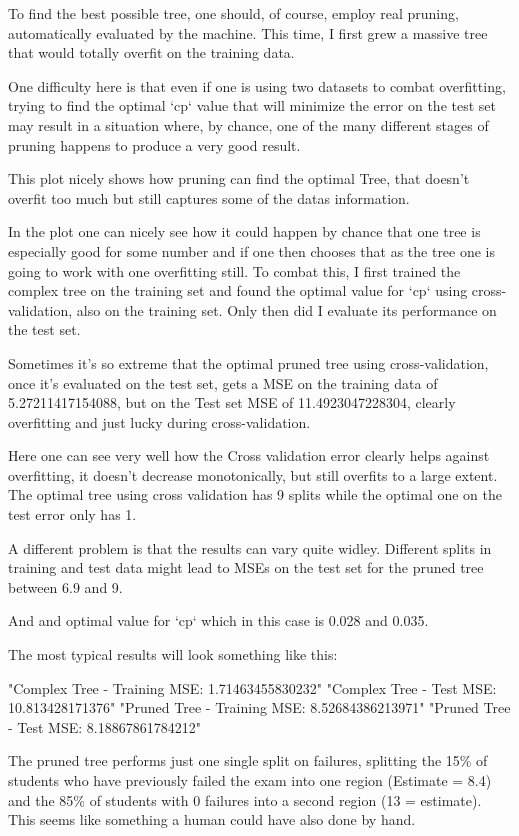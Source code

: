 \documentclass[12pt]{article}
\begin{document}
To find the best possible tree, one should, of course, employ real pruning, automatically evaluated by the machine. This time, I first grew a massive tree that would totally overfit on the training data.

One difficulty here is that even if one is using two datasets to combat overfitting, trying to find the optimal `cp` value that will minimize the error on the test set may result in a situation where, by chance, one of the many different stages of pruning happens to produce a very good result.



This plot nicely shows how pruning can find the optimal Tree, that doesn't overfit too much but still captures some of the datas information.

In the  plot one can nicely see how it could happen by chance that one tree is especially good for some number and if one then chooses that as the tree one is going to work with one overfitting still.
To combat this, I first trained the complex tree on the training set and found the optimal value for `cp` using cross-validation, also on the training set. Only then did I evaluate its performance on the test set.

Sometimes it's so extreme that the optimal pruned tree using cross-validation, once it's evaluated on the test set, gets a MSE on the training data of 5.27211417154088, but on the Test set MSE of 11.4923047228304, clearly overfitting and just lucky during cross-validation.

Here one can see very well how the Cross validation error clearly helps against overfitting, it doesn't decrease monotonically, but still overfits to a large extent. The optimal tree using cross validation has 9 splits while the optimal one on the test error only has 1.

A different problem is that the results can vary quite widley. Different splits in training and test data might lead to MSEs on the test set for the pruned tree between 6.9 and 9. 

And and optimal value for `cp` which in this case is 0.028 and 0.035.


The most typical results will look something like this:

"Complex Tree - Training MSE: 1.71463455830232"
"Complex Tree -     Test MSE: 10.813428171376"
"Pruned Tree  - Training MSE: 8.52684386213971"
"Pruned Tree  -     Test MSE: 8.18867861784212"

The pruned tree performs just one single split on failures, splitting the 15\% of students who have previously failed the exam into one region (Estimate = 8.4) and the 85\% of students with 0 failures into a second region (13 = estimate). This seems like something a human could have also done by hand.
\end{document}
